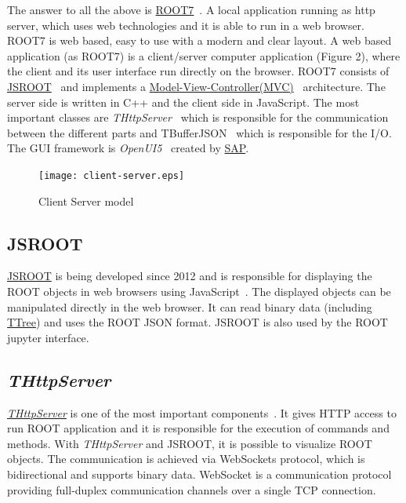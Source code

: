 \documentclass[a4paper]{jpconf}
\begin{document}
The answer to all the above is \href{https://root.cern.ch/root-7}{ROOT7}~\cite{root7}. A local
application running as http server, which uses web technologies and it is able
to run in a web browser. ROOT7 is web based, easy to use with a modern and clear layout.
%
A web based application (as ROOT7) is a client/server computer application (Figure 2),
where the client and its user interface run directly on the browser.
ROOT7 consists of \href{https://root.cern.ch/js/}{JSROOT}~\cite{jsroot} and implements a
\href{https://en.wikipedia.org/wiki/Model%E2%80%93view%E2%80%93controller}{Model-View-Controller(MVC)}~\cite{mvc}
architecture. The server side is written in C++ and the client side in JavaScript.
The most important classes are {\it THttpServer}~\cite{http} which is responsible
for the communication between the different parts and TBufferJSON~\cite{buffer}
which is responsible for the I/O. The GUI framework is \textit{OpenUI5}~\cite{openui}
created by \href{https://www.sap.com/index.html}{SAP}.

\begin{figure}[h]
  \begin{center}
    \texttt{[image: client-server.eps]}\hspace{2pc}%
  \end{center}
  \centering
\begin{minipage}[b]{20pc}\caption{\label{label}Client Server model}
\end{minipage}
\end{figure}

\subsection{JSROOT}

\href{https://github.com/root-project/jsroot/}{JSROOT} is being developed since
2012 and is responsible for displaying the ROOT objects in web browsers using
JavaScript~\cite{jsroot}. The displayed objects can be manipulated directly in
the web browser. It can read binary data (including \href{https://root.cern.ch/doc/master/classTTree.html}{TTree})
and uses the ROOT JSON format. JSROOT is also used by the ROOT jupyter interface.


\subsection{{\it THttpServer}}

\href{https://github.com/root-project/jsroot/blob/master/docs/HttpServer.md}{{\it THttpServer}} is
one of the most important components~\cite{http}. It gives HTTP access to run ROOT application
and it is responsible for the execution of commands and methods. With {\it THttpServer}
and JSROOT, it is possible to visualize ROOT objects. The communication is achieved
via WebSockets protocol, which is bidirectional and supports binary data. WebSocket
is a communication protocol providing full-duplex communication channels over a
single TCP connection.
\end{document}
